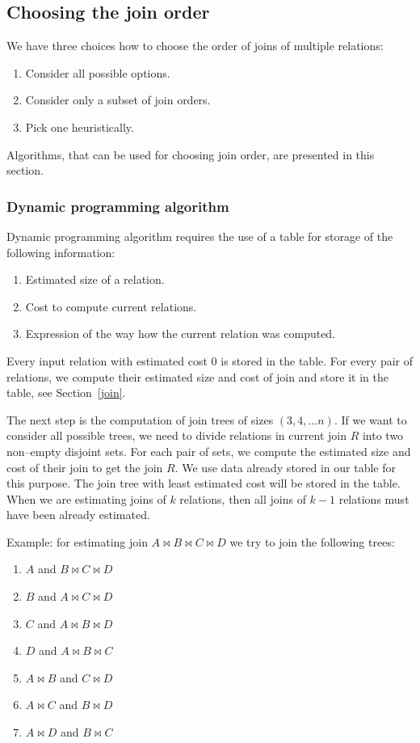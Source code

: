 \subsection{Choosing the join order}
\label{joinOrder}
 We have three choices how to choose the order of joins of multiple relations:
\begin{enumerate}
\item Consider all possible options.
\item Consider only a subset of join orders.
\item Pick one heuristically.
\end{enumerate}
 
Algorithms, that can be used for choosing join order, are presented in this section.
 
\subsubsection{Dynamic programming algorithm}
\label{dymanicalgorithm}
Dynamic programming algorithm requires the use of a table for storage of the following information:
 
\begin{enumerate}
\item Estimated size of a relation.
\item Cost to compute current relations.
\item Expression of the way how the current relation was computed.
\end{enumerate}

Every input relation with estimated cost $0$ is stored in the table. For every pair of relations, we compute their estimated size and cost of join and store it in the table, see Section~\ref{join}.  

The next step is the computation of join trees of sizes $(3,4,...n)$.
If we want to consider all possible trees, we need to divide relations in current join $R$ into two non--empty disjoint sets. For each pair of sets, we compute the estimated size and cost of their join to get the join $R$. We use data already stored in our table for this purpose. The join tree with least estimated cost will be stored in the table. When we are estimating joins of $k$ relations, then all joins of $k-1$ relations must have been already estimated. 

Example: for estimating join $A\Join B\Join C\Join D$ we try to join the following trees:
\begin{enumerate}
\item $A$ and $B\Join C\Join D$
\item $B$ and $A\Join C\Join D$
\item $C$ and $A\Join B\Join D$
\item $D$ and $A\Join B\Join C$
\item $A\Join B$ and $C\Join D$
\item $A\Join C$ and $B\Join D$
\item $A\Join D$ and $B\Join C$

\end{enumerate}

